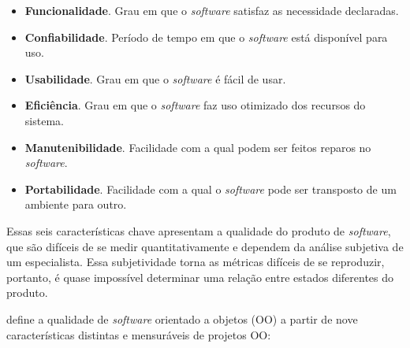 \begin{itemize}
	\item \textbf{Funcionalidade}. Grau em que o \textit{software} satisfaz as necessidade declaradas.
	\item \textbf{Confiabilidade}. Período de tempo em que o \textit{software} está disponível para uso.
	\item \textbf{Usabilidade}. Grau em que o \textit{software} é fácil de usar.
	\item \textbf{Eficiência}. Grau em que o \textit{software} faz uso otimizado dos recursos do sistema.
	\item \textbf{Manutenibilidade}. Facilidade com a qual podem ser feitos reparos no \textit{software}.
	\item \textbf{Portabilidade}. Facilidade com a qual o \textit{software} pode ser transposto de um ambiente para outro.
\end{itemize}

Essas seis características chave apresentam a qualidade do produto de \textit{software}, que são difíceis de se medir quantitativamente e dependem da análise subjetiva de um especialista. Essa subjetividade torna as métricas difíceis de se reproduzir, portanto, é quase impossível determinar uma relação entre estados diferentes do produto.

 define a qualidade de \textit{software} orientado a objetos (OO) a partir de nove características distintas e mensuráveis de projetos OO:

